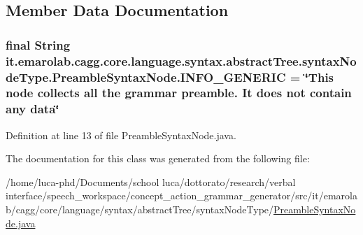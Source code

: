 \subsection{Member Data Documentation}
\hypertarget{classit_1_1emarolab_1_1cagg_1_1core_1_1language_1_1syntax_1_1abstractTree_1_1syntaxNodeType_1_1PreambleSyntaxNode_a7bac726c75d622cc23a1dee611691a4d}{
\subsubsection[{I\-N\-F\-O\-\_\-\-G\-E\-N\-E\-R\-I\-C}]{\setlength{\rightskip}{0pt plus 5cm}final String it.\-emarolab.\-cagg.\-core.\-language.\-syntax.\-abstract\-Tree.\-syntax\-Node\-Type.\-Preamble\-Syntax\-Node.\-I\-N\-F\-O\-\_\-\-G\-E\-N\-E\-R\-I\-C = \char`\"{}This node collects all the grammar preamble. It does not contain any data\char`\"{}\hspace{0.3cm}{\ttfamily [static]}}}\label{classit_1_1emarolab_1_1cagg_1_1core_1_1language_1_1syntax_1_1abstractTree_1_1syntaxNodeType_1_1PreambleSyntaxNode_a7bac726c75d622cc23a1dee611691a4d}


Definition at line 13 of file Preamble\-Syntax\-Node.\-java.



The documentation for this class was generated from the following file\-:\begin{DoxyCompactItemize}
\item 
/home/luca-\/phd/\-Documents/school luca/dottorato/research/verbal interface/speech\-\_\-workspace/concept\-\_\-action\-\_\-grammar\-\_\-generator/src/it/emarolab/cagg/core/language/syntax/abstract\-Tree/syntax\-Node\-Type/\hyperlink{PreambleSyntaxNode_8java}{Preamble\-Syntax\-Node.\-java}\end{DoxyCompactItemize}
